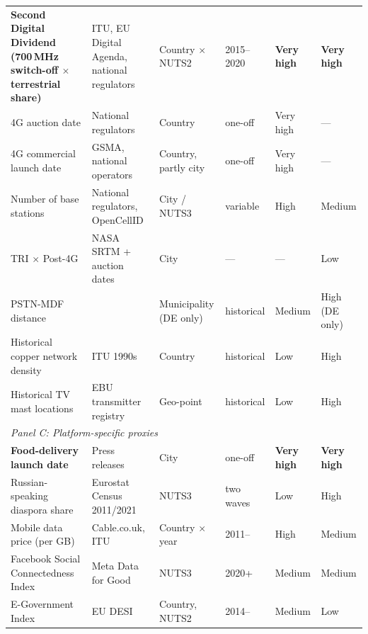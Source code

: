 \documentclass[12pt, a4paper]{article}
\begin{document}
\begin{table}[H]
\begin{tabular}{p{3.8cm} p{2.8cm} p{1.8cm} p{1.4cm} p{1.8cm} p{1.8cm}}
\textbf{Second Digital Dividend (700\,MHz switch-off $\times$ terrestrial share)} & 
ITU, EU Digital Agenda, national regulators & 
Country $\times$ NUTS2 & 
2015--2020 & 
\textbf{Very high} & 
\textbf{Very high} \\[4pt]

4G auction date & 
National regulators & 
Country & 
one-off & 
Very high & 
--- \\[4pt]

4G commercial launch date & 
GSMA, national operators & 
Country, partly city & 
one-off & 
Very high & 
--- \\[4pt]

Number of base stations & 
National regulators, OpenCellID & 
City / NUTS3 & 
variable & 
High & 
Medium \\[4pt]

TRI $\times$ Post-4G & 
NASA SRTM + auction dates & 
City & 
--- & 
--- & 
Low \\[4pt]

PSTN-MDF distance & 
\citet{falck_2014} & 
Municipality (DE only) & 
historical & 
Medium & 
High (DE only) \\[4pt]

Historical copper network density & 
ITU 1990s & 
Country & 
historical & 
Low & 
High \\[4pt]

Historical TV mast locations & 
EBU transmitter registry & 
Geo-point & 
historical & 
Low & 
High \\[6pt]

\hline
\multicolumn{6}{l}{\textit{Panel C: Platform-specific proxies}} \\[3pt]

\textbf{Food-delivery launch date} & 
Press releases & 
City & 
one-off & 
\textbf{Very high} & 
\textbf{Very high} \\[4pt]

Russian-speaking diaspora share & 
Eurostat Census 2011/2021 & 
NUTS3 & 
two waves & 
Low & 
High \\[4pt]

Mobile data price (per GB) & 
Cable.co.uk, ITU & 
Country $\times$ year & 
2011-- & 
High & 
Medium \\[4pt]

Facebook Social Connectedness Index & 
Meta Data for Good & 
NUTS3 & 
2020+ & 
Medium & 
Medium \\[4pt]

E-Government Index & 
EU DESI & 
Country, NUTS2 & 
2014-- & 
Medium & 
Low \\[3pt]

\hline\hline
\end{tabular}
\end{table}
\end{document}
